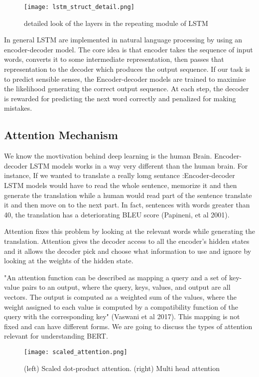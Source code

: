 \documentclass[12pt,a4paper]{article}
\numberwithin{equation}{section}
\begin{document}
\begin{figure}
    \centering
    \texttt{[image: lstm\_struct\_detail.png]}
    \caption{detailed look of the layers in the repeating module of LSTM}
   \label{fig:my_label}
\end{figure}
In general LSTM  are  implemented in natural language processing by using an encoder-decoder model. The core idea is that encoder takes the sequence of input words, converts it to some intermediate representation, then passes that representation to the decoder which produces the output sequence. If our task is to predict sensible senses, the Encoder-decoder models are trained to maximise the likelihood generating the correct output sequence. At each step, the decoder is rewarded for predicting the next word correctly and penalized for making mistakes.  
\subsection{Attention Mechanism}
We know the movtivation behind deep learning is the human Brain. Encoder-decoder LSTM models works in a way very different than the human brain. For instance, If we wanted to translate a really lomg sentance :Encoder-decoder LSTM models would have to read the whole sentence, memorize it and then generate the translation while a human would read part of the sentence translate it and then move on to the next part. In fact, sentences with words greater than 40, the translation has a deteriorating BLEU score (Papineni, et al 2001). 

Attention fixes this problem by looking at the relevant words while generating the translation. Attention gives the decoder access to all the encoder's hidden states and it allows the decoder  pick and choose what information to use and ignore by looking at the weights of the hidden state.   

"An attention function can be described as mapping a query and a set of key-value pairs to an output,
where the query, keys, values, and output are all vectors. The output is computed as a weighted sum
of the values, where the weight assigned to each value is computed by a compatibility function of the
query with the corresponding key" (Vaswani et al 2017). This mapping is not fixed and can have different forms. We are going to discuss the types of attention relevant for understanding BERT. 
\begin{figure}
    \centering
    \texttt{[image: scaled\_attention.png]}
    \caption{(left) Scaled dot-product attention. (right) Multi head attention }
   \label{fig:my_label}
\end{figure}
\end{document}
